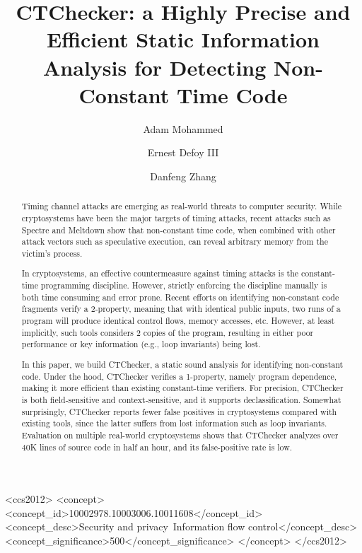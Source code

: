 \documentclass[sigconf, authorversion]{acmart}
\newcommand{\sysname}{CTChecker}
\begin{document}
\title{\sysname: a Highly Precise and Efficient Static Information Analysis for
Detecting Non-Constant Time Code}

\author{Adam Mohammed}

\author{Ernest Defoy III}

\author{Danfeng Zhang}


\begin{abstract}
Timing channel attacks are emerging as real-world threats to computer security.
While cryptosystems have been the major targets of timing attacks, recent
attacks such as Spectre and Meltdown show that non-constant time code, when
combined with other attack vectors such as speculative execution, can reveal
arbitrary memory from the victim's process.

In cryptosystems, an effective countermeasure against timing attacks is the
constant-time programming discipline. However, strictly enforcing the
discipline manually is both time consuming and error prone. Recent efforts on
identifying non-constant code fragments verify a 2-property, meaning that with
identical public inputs, two runs of a program will produce identical control
flows, memory accesses, etc. However, at least implicitly, such tools considers
2 copies of the program, resulting in either poor performance or key
information (e.g., loop invariants) being lost.

In this paper, we build \sysname, a static sound analysis for identifying
non-constant code. Under the hood, \sysname{} verifies a 1-property, namely
program dependence, making it more efficient than existing constant-time
verifiers. For precision, \sysname{} is both field-sensitive and
context-sensitive, and it supports declassification. Somewhat surprisingly,
\sysname{} reports fewer false positives in cryptosystems compared with
existing tools, since the latter suffers from lost information such as loop
invariants. Evaluation on multiple real-world cryptosystems shows that
\sysname{} analyzes over 40K lines of source code in half an hour, and its
false-positive rate is low.
\end{abstract}


%
%
 \begin{CCSXML}
<ccs2012>
<concept>
<concept_id>10002978.10003006.10011608</concept_id>
<concept_desc>Security and privacy~Information flow control</concept_desc>
<concept_significance>500</concept_significance>
</concept>
</ccs2012>
\end{CCSXML}
\end{document}
